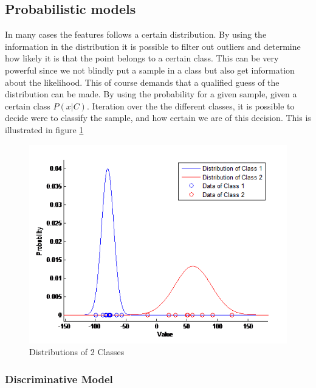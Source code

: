 \subsection{Probabilistic models}
In many cases the features follows a certain distribution. By using the information in the distribution it is possible to filter out outliers and determine how likely it is that the point belongs to a certain class. This can be very powerful since we not blindly put a sample in a class but also get information about the likelihood. This of course demands that a qualified guess of the distribution can be made. 
By using the probability for a given sample, given a certain class $P(x|C)$. Iteration over the the different classes, it is possible to decide were to classify the sample, and how certain we are of this decision. This is illustrated in figure \ref{fig:disex} 

\begin{figure}[H]
\centering
\includegraphics[scale=0.8]{billeder/DisEx}
\caption{Distributions of 2 Classes}
\label{fig:disex}
\end{figure}

\subsubsection{Discriminative Model}

